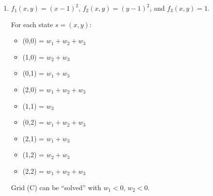 \documentclass[12pt]{article}
\begin{document}
\begin{enumerate}
\begin{enumerate}
  \item $f_1(x, y) = (x - 1)^2$, $f_2(x, y) = (y - 1)^2$, and $f_3(x, y) = 1$.

  For each state $s = (x, y)$: 
  \begin{itemize}
    \item (0,0) = $w_1 + w_2 + w_3$
    \item (1,0) = $w_2 + w_3$
    \item (0,1) = $w_1 + w_3$
    \item (2,0) = $w_1 + w_2 + w_3$
    \item (1,1) = $w_3$
    \item (0,2) = $w_1 + w_2 + w_3$
    \item (2,1) = $w_1 + w_3$
    \item (1,2) = $w_2 + w_3$
    \item (2,2) = $w_1 + w_2 + w_3$
  \end{itemize}

  Grid (C) can be ``solved'' with $w_1 < 0$, $w_2 < 0$.

  \end{enumerate}

\end{enumerate}
\end{document}
